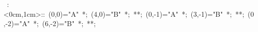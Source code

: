 \hbox{
\xy    <1cm,0cm>:<0cm,1cm>::
       (0,0)="A" *{\bullet}; (4,0)="B" *{\bullet}; **\dir{-}; 
       (0,-1)="A" *{\bullet}; (3,-1)="B" *{\bullet}; **\dir{-}; 
       (0,-2)="A" *{\bullet}; (6,-2)="B" *{\bullet}; **\dir{-}; 
       \endxy}
 
